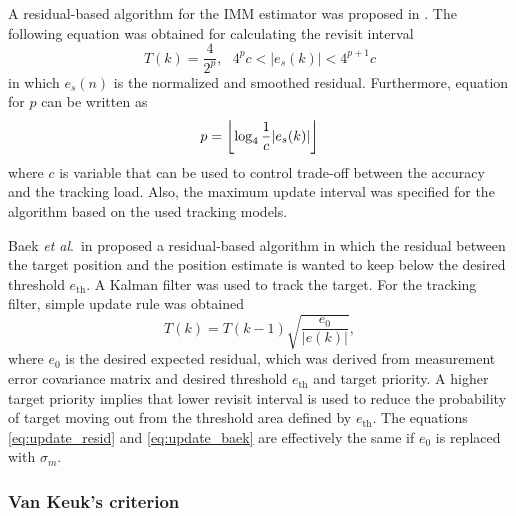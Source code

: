\documentclass[english, 12pt, a4paper, elec, utf8, a-1b, online]{aaltothesis}
\newcommand{\etal}{\textit{et al}.~}
\DeclarePairedDelimiter\floor{\lfloor}{\rfloor}
\begin{document}
A residual-based algorithm for the IMM estimator was proposed in \cite{ChengTing2007}.
The following equation was obtained for calculating the revisit interval
\begin{equation}
    T(k) = \frac{4}{2^p}, \text{ } 4^p c < |e_s(k)| < 4^{p+1}c
\end{equation}
in which $e_s(n)$ is the normalized and smoothed residual.
Furthermore, equation for $p$ can be written as
\begin{equation}
    p = \floor*{\log_4\frac{1}{c}|e_s(k)|}
\end{equation}
where $c$ is variable that can be used to control trade-off between the accuracy and the tracking load.
Also, the maximum update interval was specified for the algorithm based on the used tracking models.

Baek \etal in \cite{Baek2010} proposed a residual-based algorithm in which the residual between the target position and the position estimate is wanted to keep below the desired threshold $e_\text{th}$.
A Kalman filter was used to track the target.
For the tracking filter, simple update rule was obtained
\begin{equation}\label{eq:update_baek}
    T(k) = T(k - 1) \sqrt{\frac{e_0}{|e(k)|}},
\end{equation}
where $e_0$ is the desired expected residual, which was derived from measurement error covariance matrix and desired threshold $e_\text{th}$ and target priority.
A higher target priority implies that lower revisit interval is used to reduce the probability of target moving out from the threshold area defined by $e_\text{th}$.
The equations \eqref{eq:update_resid} and \eqref{eq:update_baek} are effectively the same if $e_0$ is replaced with $\sigma_m$.


\subsubsection{Van Keuk's criterion}
\end{document}
